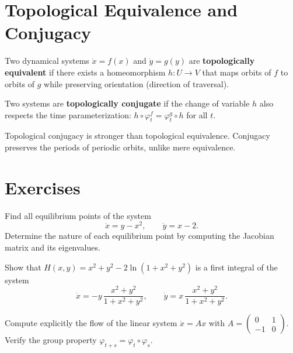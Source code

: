 \section{Topological Equivalence and Conjugacy}

\begin{definition}
Two dynamical systems $\dot{x} = f(x)$ and $\dot{y} = g(y)$ are
\textbf{topologically equivalent} if there exists a homeomorphism
$h : U \to V$ that maps orbits of $f$ to orbits of $g$ while preserving
orientation (direction of traversal).
\end{definition}

\begin{definition}
Two systems are \textbf{topologically conjugate} if the change of variable
$h$ also respects the time parameterization:
$h \circ \varphi_t^f = \varphi_t^g \circ h$ for all $t$.
\end{definition}

\begin{remark}
Topological conjugacy is stronger than topological equivalence. Conjugacy
preserves the periods of periodic orbits, unlike mere equivalence.
\end{remark}

\section{Exercises}

\begin{exercise}
Find all equilibrium points of the system
\[
    \dot{x} = y - x^2, \qquad \dot{y} = x - 2.
\]
Determine the nature of each equilibrium point by computing the Jacobian
matrix and its eigenvalues.
\end{exercise}

\begin{exercise}
Show that $H(x, y) = x^2 + y^2 - 2\ln(1 + x^2 + y^2)$ is a first integral
of the system
\[
    \dot{x} = -y\,\frac{x^2 + y^2}{1 + x^2 + y^2}, \qquad
    \dot{y} = x\,\frac{x^2 + y^2}{1 + x^2 + y^2}.
\]
\end{exercise}

\begin{exercise}
Compute explicitly the flow of the linear system $\dot{x} = Ax$ with
$A = \begin{pmatrix} 0 & 1 \\ -1 & 0 \end{pmatrix}$.
Verify the group property $\varphi_{t+s} = \varphi_t \circ \varphi_s$.
\end{exercise}

